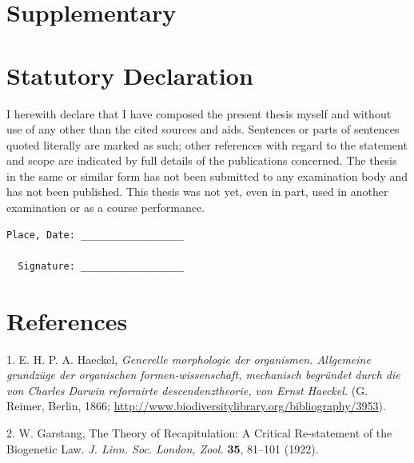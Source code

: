 \documentclass[11pt,singlespacinge,twoside]{reedthesis} %
\begin{document}
\appendix

\hypertarget{supplementary}{%
\chapter*{Supplementary}\label{supplementary}}

\hypertarget{statutory-declaration}{%
\chapter*{\texorpdfstring{\textbf{Statutory Declaration}}{Statutory Declaration}}\label{statutory-declaration}}

I herewith declare that I have composed the present thesis myself and without use of any other than the
cited sources and aids. Sentences or parts of sentences quoted literally are marked as such; other references
with regard to the statement and scope are indicated by full details of the publications concerned. The thesis
in the same or similar form has not been submitted to any examination body and has not been published.
This thesis was not yet, even in part, used in another examination or as a course performance.
\begin{verbatim}
Place, Date: __________________           

  Signature: __________________
\end{verbatim}
\backmatter

\hypertarget{references}{%
\chapter*{References}\label{references}}


\noindent

\setlength{\parindent}{-0.20in}
\setlength{\leftskip}{0.20in}
\setlength{\parskip}{8pt}

\hypertarget{refs}{}
\leavevmode\hypertarget{ref-Haeckel1866}{}%
1. E. H. P. A. Haeckel, \emph{Generelle morphologie der organismen. Allgemeine grundzüge der organischen formen-wissenschaft, mechanisch begründet durch die von Charles Darwin reformirte descendenztheorie, von Ernst Haeckel.} (G. Reimer, Berlin, 1866; \url{http://www.biodiversitylibrary.org/bibliography/3953}).

\leavevmode\hypertarget{ref-Garstang1922}{}%
2. W. Garstang, The Theory of Recapitulation: A Critical Re-statement of the Biogenetic Law. \emph{J. Linn. Soc. London, Zool.} \textbf{35}, 81--101 (1922).
\end{document}

